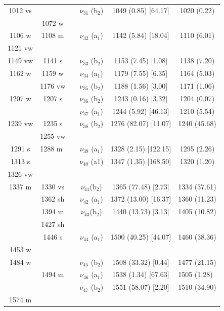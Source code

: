 \begin{table}[H]
\begin{center}
\begin{threeparttable}
\begin{tabular}{c c c c c c}
 1012 vs &  &  & $\nu_{31}$ (b$_{2}$) & 1049 (0.85) [64.17] & 1020 (0.22) \\ 
 & 1072 w &  &  &  &  \\ 
 1106 w & 1108 m &  & $\nu_{32}$ (a$_{1}$) & 1142 (5.84) [18.04] & 1110 (6.01) \\ 
 1121 vw &  &  &  &  &  \\ 
 1149 vw & 1141 s	 &  & $\nu_{33}$ (b$_{2}$)
 & 1153 (7.45) [1.08] & 1138 (7.20) \\ 
 1162 w & 1159 w &  & \multicolumn{1}{c}{$\nu_{34}$ (a$_{1}$)} & 1179 (7.55) [6.35] & 1164 (5.03) \\ 
 & 1176 vw &  & $\nu_{35}$ (b$_{2}$) & 1188 (1.56) [3.00] & 1171 (1.06)	 \\ 
 1207 w & 1207 s &  & $\nu_{36}$ (b$_{2}$) & 1243 (0.16) [3.32]& 1204 (0.07) \\
   &   &   & $\nu_{37}$ (a$_{1}$) & 1244 (5.92) [46.13] & 1210 (5.54)	 \\
1239 vw & 1235 s& & $\nu_{38}$ (b$_{2}$)& 1276 (82.07) [11.07] & \multicolumn{1}{l}{1240 (45.68)} \\ 
& 1255 vw &  &  &  & \multicolumn{1}{l}{} \\ 
1291 s & \multicolumn{1}{l}{1288 m} &  &  $\nu_{39}$ (a$_{1}$)
& 1328 (2.15) [122.15] & 1295 (2.26)\\ 
1313 s &  &  & \multicolumn{1}{c}{$\nu_{40}$ (a1)} & 1347 (1.35) [168.50] & 1320 (1.20) \\ 
1326 vw &  &  & \multicolumn{1}{c}{} &  &  \\ 
1337 m & 1330 vs &  &  $\nu_{41}$(b$_{2}$)& 1365 (77.48) [2.73] & 1334 (37.61)\\ 
& 1362 sh	&  &  $\nu_{42}$ (a$_{1}$)	& 1372 (13.00) [16.37] &  1360 (11.23) \\ 
& 1394 m&  & \multicolumn{1}{c}{$\nu_{43}$(b$_{2}$)	} & 1440 (13.73) [3.13] &  1405 (10.82)	\\ 
& 1427 sh &  &  &  &  \\ 
& 1446 s&  &       $\nu_{44}$ (a$_{1}$)	& 1500 (40.25) [44.07] &  1460 (38.36)	\\ 
1453 w &  &  &  &  &  \\ 
1484 w &  &  &  $\nu_{45}$ (b$_{2}$) & 1508 (33.32) [0.44] & 1477 (21.15) \\ 
& 1494 m &  &  $\nu_{46}$ (a$_{1}$) & 1538 (1.34) [67.63] & \multicolumn{1}{l}{1505 (1.28)} \\ 
&  &  &      $\nu_{47}$ (b$_{2}$) & 1551 (58.07) [2.20] & 1510 (34.90) \\ 
1574 m &  &  &  &  & \multicolumn{1}{l}{} \\


\end{tabular}
\end{threeparttable}
\end{center}
\end{table}

